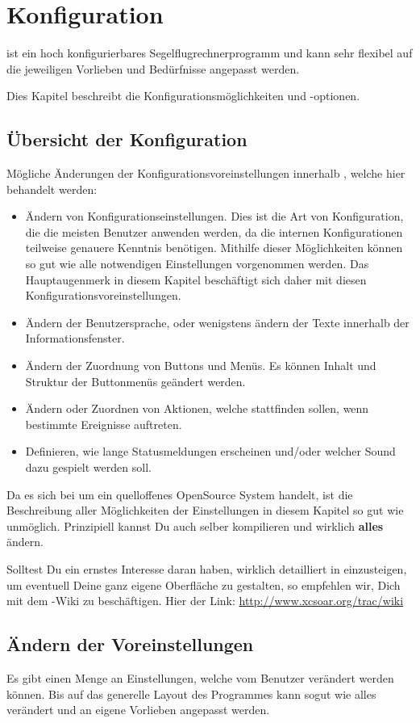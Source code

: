 \chapter{Konfiguration}\label{cha:configuration}
\xc ist ein hoch konfigurierbares Segelflugrechnerprogramm und kann sehr flexibel auf die jeweiligen Vorlieben
und Bedürfnisse angepasst werden.

Dies Kapitel beschreibt die Konfigurationsmöglichkeiten und  -optionen.
\section{Übersicht der Konfiguration}
Mögliche  Änderungen der Konfigurationsvoreinstellungen innerhalb \xc, welche hier behandelt werden:
\begin{itemize}
\item Ändern von  Konfigurationseinstellungen. Dies ist die Art von Konfiguration, die die meisten
    Benutzer anwenden werden, da die internen Konfigurationen teilweise genauere Kenntnis benötigen.
    Mithilfe dieser Möglichkeiten können so gut wie alle notwendigen  Einstellungen vorgenommen werden.
    Das Hauptaugenmerk in diesem Kapitel beschäftigt sich daher mit diesen Konfigurationsvoreinstellungen.
 \item Ändern der Benutzersprache, oder wenigstens ändern der Texte innerhalb der
     Informationsfenster.
\item Ändern der Zuordnung von Buttons und Menüs. Es können Inhalt und Struktur der Buttonmenüs
    geändert werden.
\item Ändern oder Zuordnen von Aktionen, welche stattfinden sollen, wenn bestimmte Ereignisse
    auftreten.
\item Definieren, wie lange Statusmeldungen erscheinen und/oder welcher Sound dazu gespielt werden
    soll.
\end{itemize}
Da es sich bei \xc  um ein quelloffenes OpenSource System handelt, ist die Beschreibung aller
Möglichkeiten der Einstellungen in diesem Kapitel so gut wie unmöglich. Prinzipiell kannst Du \xc auch
selber kompilieren und wirklich \textbf{alles} ändern.

Solltest Du ein ernstes Interesse daran haben, wirklich detailliert in \xc  einzusteigen, um eventuell Deine
ganz eigene Oberfläche zu gestalten, so empfehlen wir,  Dich mit dem \xc-Wiki  zu beschäftigen. Hier der
Link: \url{http://www.xcsoar.org/trac/wiki}


\section{Ändern der Voreinstellungen}
Es gibt einen Menge an Einstellungen, welche vom Benutzer verändert werden
können. Bis auf das generelle Layout des Programmes kann
 sogut wie alles verändert und
an eigene Vorlieben angepasst werden.

